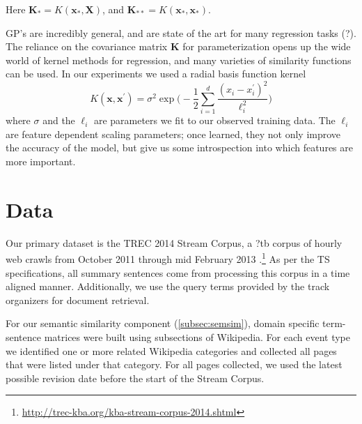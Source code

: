 \documentclass{sig-alternate}
\begin{document}
Here $\mathbf{K}_* = K(\mathbf{x}_*, \mathbf{X})$, and 
$\mathbf{K}_{**} = K(\mathbf{x}_*, \mathbf{x}_*)$.


GP's are incredibly general, and are state of the art for many regression 
tasks (?). The reliance on the covariance matrix 
$\mathbf{K}$ for parameterization opens up the wide world of kernel methods
for regression, and many varieties of similarity functions can be used.
In our experiments we used a radial basis function kernel 
$$K(\mathbf{x},\mathbf{x}^\prime) = \sigma^2 \exp\bigg(- \frac{1}{2} 
\sum_{i=1}^d \frac{ (x_i-x^\prime_i)^2}{\ell_i^2} \bigg)$$ where 
$\sigma$ and the $\ell_i$ are parameters we fit to our observed training data.
The $\ell_i$ are feature dependent scaling parameters; once learned, they not
only improve the accuracy of the model, but give us some introspection 
into which features are more important.



\section{Data}\label{sec:data}

Our primary dataset is the TREC 2014 Stream Corpus, a ?tb corpus of hourly 
web crawls from October 2011
through mid February 2013 \cite{frank2012building}.\footnote{\url{http://trec-kba.org/kba-stream-corpus-2014.shtml}}
As per the TS specifications, all summary sentences come from processing this
corpus in a time aligned manner. Additionally, we use the query terms 
provided by the track organizers for document retrieval.

For our semantic similarity component (\cref{subsec:semsim}),
domain specific term-sentence matrices were built using subsections of
Wikipedia. For each event type we identified one or more related Wikipedia
categories and collected all pages that were listed under that category.
For all pages collected, we used the latest possible revision date before the
start of the Stream Corpus.
\end{document}
